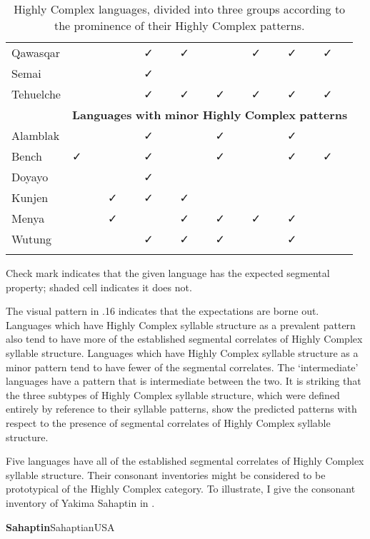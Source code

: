 \begin{table}
\begin{tabularx}{\textwidth}{XXXXXXXXX}
\hhline{~--------}
 Qawasqar &  &  & ✓ & ✓ &  & ✓ & ✓ & ✓\\
\hhline{~--------}
 Semai &  &  & ✓ &  &  &  &  & \\
\hhline{~--------}
 Tehuelche &  &  & ✓ & ✓ & ✓ & ✓ & ✓ & ✓\\
& \multicolumn{8}{c}{ \textbf{Languages} \textbf{with} \textbf{minor} \textbf{Highly} \textbf{Complex} \textbf{patterns}}\\
\hhline{~--------}
 Alamblak &  &  & ✓ &  & ✓ &  & ✓ & \\
\hhline{~--------}
 Bench & ✓ &  & ✓ &  & ✓ &  & ✓ & ✓\\
\hhline{~--------}
 Doyayo &  &  & ✓ &  &  &  &  & \\
\hhline{~--------}
 Kunjen &  & ✓ & ✓ & ✓ &  &  &  & \\
\hhline{~--------}
 Menya &  & ✓ &  & ✓ & ✓ & ✓ & ✓ & \\
\hhline{~--------}
 Wutung &  &  & ✓ & ✓ & ✓ &  & ✓ & \\
\lspbottomrule
\end{tabularx}
\caption{\label{4.16}Highly Complex languages, divided into three groups according to the prominence of their Highly Complex patterns.}Check mark indicates that the given language has the expected segmental property; shaded cell indicates it does not.
\end{table}

  The visual pattern in .16 indicates that the expectations are borne out. Languages which have Highly Complex syllable structure as a prevalent pattern also tend to have more of the established segmental correlates of Highly Complex syllable structure. Languages which have Highly Complex syllable structure as a minor pattern tend to have fewer of the segmental correlates. The ‘intermediate’ languages have a pattern that is intermediate between the two. It is striking that the three subtypes of Highly Complex syllable structure, which were defined entirely by reference to their syllable patterns, show the predicted patterns with respect to the presence of segmental correlates of Highly Complex syllable structure.

  Five languages have all of the established segmental correlates of Highly Complex syllable structure. Their consonant inventories might be considered to be prototypical of the Highly Complex category. To illustrate, I give the consonant inventory of Yakima Sahaptin in .

\ea\label{ex:(4.35)}
 \textbf{Sahaptin}{Sahaptian}{USA}

